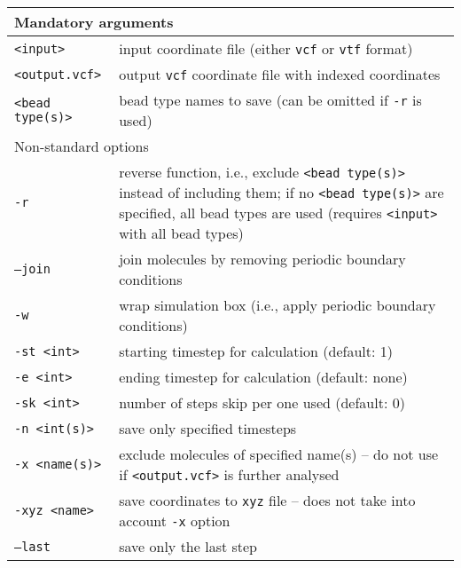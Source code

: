 \vspace{1em}
\noindent
\begin{longtable}{p{}p{}}
  \toprule
  \multicolumn{2}{l}{Mandatory arguments} \\
  \midrule
  \texttt{<input>} & input coordinate file (either \texttt{vcf} or
    \texttt{vtf} format) \\
  \texttt{<output.vcf>} & output \texttt{vcf} coordinate file with indexed
    coordinates \\
  \texttt{<bead type(s)>} & bead type names to save (can be omitted if
    \texttt{-r} is used) \\
  \toprule
  \multicolumn{2}{l}{Non-standard options} \\
  \midrule
  \texttt{-r} & reverse function, i.e., exclude \texttt{<bead type(s)>}
    instead of including them; if no \texttt{<bead type(s)>} are specified,
    all bead types are used (requires \texttt{<input>} with all bead types) \\
  \texttt{--join} & join molecules by removing periodic boundary conditions \\
  \texttt{-w} & wrap simulation box (i.e., apply periodic boundary conditions) \\
  \texttt{-st <int>} & starting timestep for calculation (default: 1) \\
  \texttt{-e <int>} & ending timestep for calculation (default: none) \\
  \texttt{-sk <int>} & number of steps skip per one used (default: 0) \\
  \texttt{-n <int(s)>} & save only specified timesteps \\
  \texttt{-x <name(s)>} & exclude molecules of specified name(s) -- do not
    use if \texttt{<output.vcf>} is further analysed \\
  \texttt{-xyz <name>} & save coordinates to \texttt{xyz} file -- does not
    take into account \texttt{-x} option \\
  \texttt{--last} & save only the last step \\
  \bottomrule
\end{longtable}
